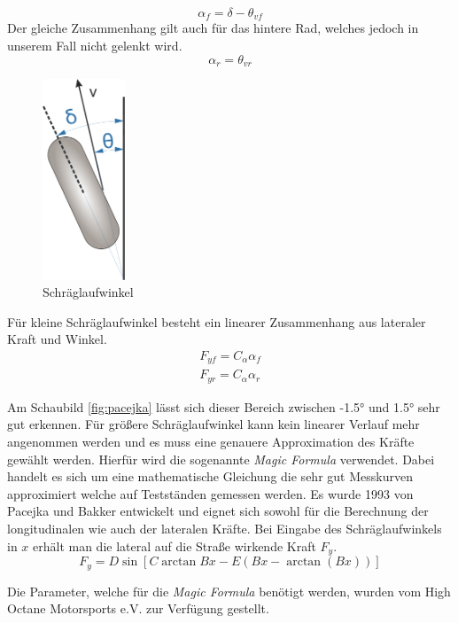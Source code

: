 \documentclass{like}
\begin{document}
\begin{equation}
\alpha_f = \delta - \theta_{vf}
\end{equation}
Der gleiche Zusammenhang gilt auch für das hintere Rad, welches jedoch in unserem Fall nicht gelenkt wird.
\begin{equation}
\alpha_r = \theta_{vr}
\end{equation}


\begin{figure}[ht!]
	\centering
	\includegraphics[width=70pt]{Abbildungen/slipAngle.png}
	\caption{Schräglaufwinkel}
	\label{fig:linLat}
\end{figure}


Für kleine Schräglaufwinkel besteht ein linearer Zusammenhang aus lateraler Kraft und Winkel. 
\begin{eqnarray}
F_{yf} = C_\alpha \alpha_f \\
F_{yr} = C_\alpha \alpha_r
\end{eqnarray}

Am Schaubild \ref{fig:pacejka} lässt sich dieser Bereich zwischen -1.5° und 1.5° sehr gut erkennen. Für größere Schräglaufwinkel kann kein linearer Verlauf mehr angenommen werden und es muss eine genauere Approximation des Kräfte gewählt werden. Hierfür wird die sogenannte \textit{Magic Formula}  \cite{magicFormula} verwendet. Dabei handelt es sich um eine mathematische Gleichung die sehr gut Messkurven approximiert welche auf Testständen gemessen werden.
Es wurde 1993 von Pacejka und Bakker entwickelt und eignet sich sowohl für die Berechnung der longitudinalen wie auch der lateralen Kräfte. Bei Eingabe des Schräglaufwinkels in \(x\) erhält man die lateral auf die Straße wirkende Kraft \(F_y\). 
\begin{equation}
F_y = D\sin[C\arctan{Bx - E(Bx - \arctan(Bx))}]
\label{eq:magicF}
\end{equation}

Die Parameter, welche für die \textit{Magic Formula} benötigt werden, wurden vom High Octane Motorsports e.V. zur Verfügung gestellt.
\end{document}

